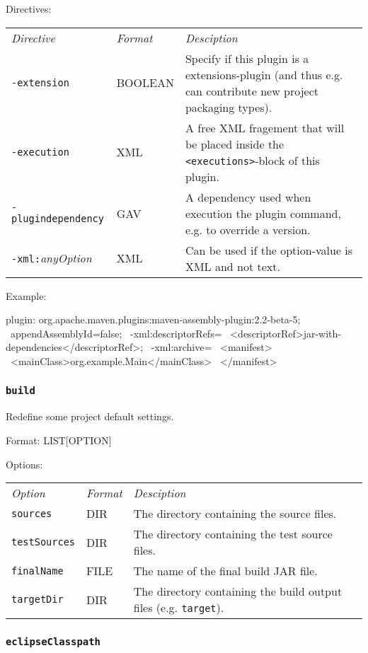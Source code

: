 \documentclass[a4paper,12pt,english,oneside,halfparskip]{scrartcl}
\newcommand{\code}[1]{\texttt{#1}}
\begin{document}
Directives: 

\begin{tabular}{llp{}}
\emph{Directive} & \emph{Format} & \emph{Desciption} \\
\code{-extension} & BOOLEAN & Specify if this plugin is a extensions-plugin (and thus e.g. can contribute new project packaging types). \\
\code{-execution} & XML & A free XML fragement that will be placed inside the \code{<executions>}-block of this plugin. \\
\code{-plugindependency} & GAV & A dependency used when execution the plugin command, e.g. to override a version. \\
\code{-xml:}\emph{anyOption} & XML & Can be used if the option-value is XML and not text. \\
\end{tabular}

Example:
\begin{Cmdline}
plugin: org.apache.maven.plugins:maven-assembly-plugin:2.2-beta-5; \
 appendAssemblyId=false; \
 -xml:descriptorRefs= \
    <descriptorRef>jar-with-dependencies</descriptorRef>; \
 -xml:archive= \
    <manifest> \
      <mainClass>org.example.Main</mainClass> \
    </manifest>
\end{Cmdline}


\subsubsection{\code{build}}

Redefine some project default settings.

Format: LIST[OPTION]

Options:

\begin{tabular}{llp{}}
\emph{Option} & \emph{Format} & \emph{Desciption} \\
\code{sources} &  DIR & The directory containing the source files. \\
\code{testSources} &  DIR & The directory containing the test source files. \\
\code{finalName} &  FILE & The name of the final build JAR file. \\
\code{targetDir} & DIR & The directory containing the build output files (e.g. \code{target}).
\end{tabular}


\subsubsection{\code{eclipseClasspath}}
\label{secSettingEclipseClasspath}
\end{document}

